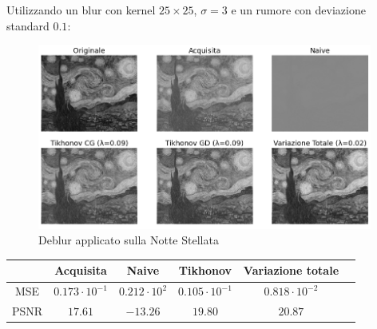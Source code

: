 \documentclass[11pt]{article}
\begin{document}
Utilizzando un blur con kernel $25 \times 25$, $\sigma=3$ e un rumore con deviazione standard $0.1$:
\begin{figure}[H]
    \centering
    \includegraphics[width=11cm]{reale/1/2/deblur.png}
    \caption{Deblur applicato sulla Notte Stellata}
    \label{fig:deblur_reale1_2}
\end{figure}
\begin{center}
    \begin{tabular}{ |c|c|c|c|c|c| }
    \hline
    & Acquisita & Naive & Tikhonov & Variazione totale \\ 
    \hline
    MSE & $0.173 \cdot 10^{-1}$ & $0.212 \cdot 10^{2}$ & $0.105 \cdot 10^{-1}$ & $0.818 \cdot 10^{-2}$ \\ 
    PSNR & $17.61$ & $-13.26$ & $19.80$ & $20.87$ \\ 
    \hline
    \end{tabular}
\end{center}
\end{document}

